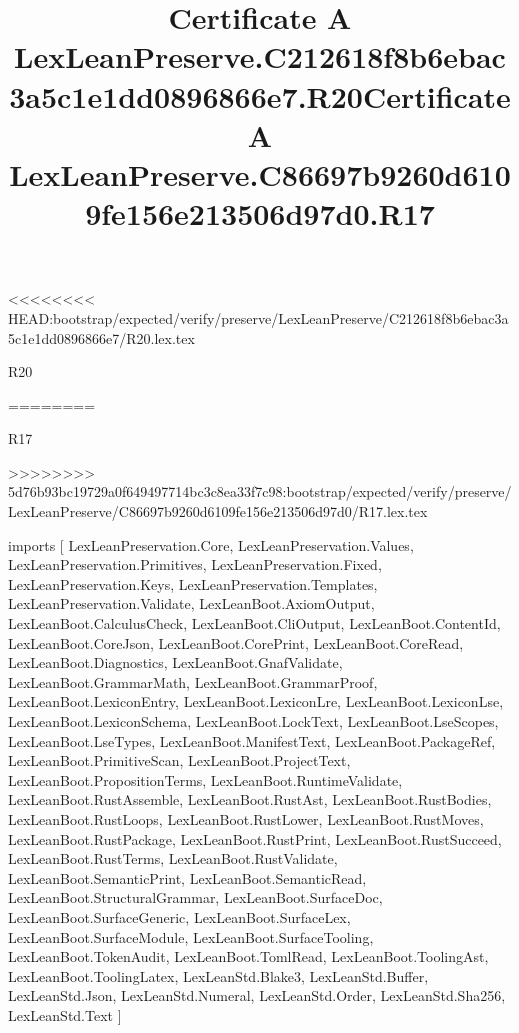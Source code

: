 <<<<<<<< HEAD:bootstrap/expected/verify/preserve/LexLeanPreserve/C212618f8b6ebac3a5c1e1dd0896866e7/R20.lex.tex
\begin{lexlean}{R20}
\title{Certificate A LexLeanPreserve.C212618f8b6ebac3a5c1e1dd0896866e7.R20}
========
\begin{lexlean}{R17}
\title{Certificate A LexLeanPreserve.C86697b9260d6109fe156e213506d97d0.R17}
>>>>>>>> 5d76b93bc19729a0f649497714bc3c8ea33f7c98:bootstrap/expected/verify/preserve/LexLeanPreserve/C86697b9260d6109fe156e213506d97d0/R17.lex.tex
\begin{coremodule}
imports [
  LexLeanPreservation.Core,
  LexLeanPreservation.Values,
  LexLeanPreservation.Primitives,
  LexLeanPreservation.Fixed,
  LexLeanPreservation.Keys,
  LexLeanPreservation.Templates,
  LexLeanPreservation.Validate,
  LexLeanBoot.AxiomOutput,
  LexLeanBoot.CalculusCheck,
  LexLeanBoot.CliOutput,
  LexLeanBoot.ContentId,
  LexLeanBoot.CoreJson,
  LexLeanBoot.CorePrint,
  LexLeanBoot.CoreRead,
  LexLeanBoot.Diagnostics,
  LexLeanBoot.GnafValidate,
  LexLeanBoot.GrammarMath,
  LexLeanBoot.GrammarProof,
  LexLeanBoot.LexiconEntry,
  LexLeanBoot.LexiconLre,
  LexLeanBoot.LexiconLse,
  LexLeanBoot.LexiconSchema,
  LexLeanBoot.LockText,
  LexLeanBoot.LseScopes,
  LexLeanBoot.LseTypes,
  LexLeanBoot.ManifestText,
  LexLeanBoot.PackageRef,
  LexLeanBoot.PrimitiveScan,
  LexLeanBoot.ProjectText,
  LexLeanBoot.PropositionTerms,
  LexLeanBoot.RuntimeValidate,
  LexLeanBoot.RustAssemble,
  LexLeanBoot.RustAst,
  LexLeanBoot.RustBodies,
  LexLeanBoot.RustLoops,
  LexLeanBoot.RustLower,
  LexLeanBoot.RustMoves,
  LexLeanBoot.RustPackage,
  LexLeanBoot.RustPrint,
  LexLeanBoot.RustSucceed,
  LexLeanBoot.RustTerms,
  LexLeanBoot.RustValidate,
  LexLeanBoot.SemanticPrint,
  LexLeanBoot.SemanticRead,
  LexLeanBoot.StructuralGrammar,
  LexLeanBoot.SurfaceDoc,
  LexLeanBoot.SurfaceGeneric,
  LexLeanBoot.SurfaceLex,
  LexLeanBoot.SurfaceModule,
  LexLeanBoot.SurfaceTooling,
  LexLeanBoot.TokenAudit,
  LexLeanBoot.TomlRead,
  LexLeanBoot.ToolingAst,
  LexLeanBoot.ToolingLatex,
  LexLeanStd.Blake3,
  LexLeanStd.Buffer,
  LexLeanStd.Json,
  LexLeanStd.Numeral,
  LexLeanStd.Order,
  LexLeanStd.Sha256,
  LexLeanStd.Text
]


\end{coremodule}
\end{lexlean}
\end{lexlean}
